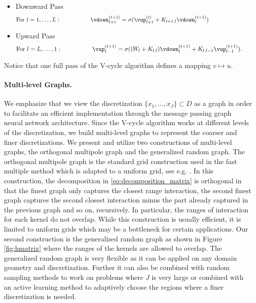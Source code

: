\begin{itemize}
    \item  Downward Pass
    \begin{equation}\label{eq:up}
    \textnormal{For}\ l = 1, \ldots, L: 
    \hspace{0.7in}
         \vdown_{l+1}^{(t+1)} = \sigma(\vup_{l+1}^{(t)} +  K_{l+1,l} \vdown_{l}^{(t+1)} )
     \hspace{1.3in}
    \end{equation}
    \item  Upward Pass
    \begin{equation}\label{eq:down}
    \textnormal{For}\ l = L, \ldots, 1: 
    \hspace{0.7in}
       \vup_{l}^{(t+1)} = \sigma( (W_l+ K_{l,l}) \vdown_{l}^{(t+1)}  +  K_{l,l-1} \vup_{l-1}^{(t+1)}).
   \hspace{0.5in}
    \end{equation}
\end{itemize}
Notice that one full pass of the V-cycle algorithm defines a mapping \(v \mapsto u\).

\paragraph{Multi-level Graphs.}
We emphasize that we view the discretization \(\{x_1,\dots,x_J\} \subset D\) as a graph in order to facilitate an efficient implementation through the message passing graph neural network architecture. Since the V-cycle algorithm works at different levels of the discretization, we build multi-level graphs to represent the coarser and finer discretizations. 
We present and utilize two constructions of multi-level graphs, the orthogonal multipole graph and the generalized random graph.
The orthogonal multipole graph is the standard grid construction used in the fast multiple method which is adapted to a uniform grid, see e.g. \citep{greengard1997new}. In this construction, the decomposition in \eqref{eq:decomposition_matrix} is orthogonal in that the finest graph only captures the closest range interaction, the second finest graph captures the second closest interaction minus the part already captured in the previous graph and so on, recursively. In particular, the ranges of interaction for each kernel do not overlap. While this construction is usually efficient, it is limited to uniform grids which may be a bottleneck for certain applications.
Our second construction is the generalized random graph as shown in Figure \ref{fig:hmatrix} where the ranges of the kernels are allowed to overlap. The generalized random graph is very flexible as it can be applied on any domain geometry and discretization. Further it can also be combined with random sampling methods to work on problems where \(J\) is very large or combined with an active learning method to adaptively choose the regions where a finer discretization is needed. 

